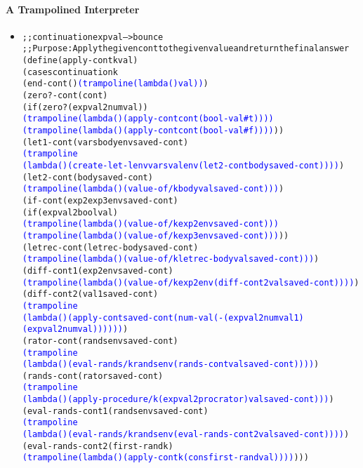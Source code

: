 \documentclass{beamer}
\begin{document}
\begin{frame}[fragile]
\framesubtitle{A Trampolined Interpreter}
\begin{tiny}
\begin{itemize}

\item<1->
\begin{alltt}
;; continuation expval --> bounce
;; Purpose: Apply the given cont to the given value and return the final answer
(define (apply-cont k val)
  (cases continuation k
    (end-cont () \textcolor{blue}{(trampoline (lambda () val))})
    (zero?-cont (cont)
     (if (zero? (expval2num val))
         \textcolor{blue}{(trampoline (lambda () (apply-cont cont (bool-val #t))))}
         \textcolor{blue}{(trampoline (lambda () (apply-cont cont (bool-val #f))))}))
    (let1-cont (vars body env saved-cont)
     \textcolor{blue}{(trampoline
      (lambda () (create-let-lenv vars val env (let2-cont body saved-cont))))})
    (let2-cont (body saved-cont)
     \textcolor{blue}{(trampoline (lambda () (value-of/k body val saved-cont)))})
    (if-cont (exp2 exp3 env saved-cont)
     (if (expval2bool val)
         \textcolor{blue}{(trampoline (lambda () (value-of/k exp2 env saved-cont)))}
         \textcolor{blue}{(trampoline (lambda () (value-of/k exp3 env saved-cont)))}))
    (letrec-cont (letrec-body saved-cont)
     \textcolor{blue}{(trampoline (lambda () (value-of/k letrec-body val saved-cont)))})
    (diff-cont1 (exp2 env saved-cont)
     \textcolor{blue}{(trampoline (lambda () (value-of/k exp2 env (diff-cont2 val saved-cont))))})
    (diff-cont2 (val1 saved-cont)
     \textcolor{blue}{(trampoline
      (lambda () (apply-cont saved-cont (num-val (- (expval2num val1) (expval2num val))))))})
    (rator-cont (rands env saved-cont)
     \textcolor{blue}{(trampoline 
      (lambda () (eval-rands/k rands env (rands-cont val saved-cont))))})
    (rands-cont (rator saved-cont)
     \textcolor{blue}{(trampoline
      (lambda () (apply-procedure/k (expval2proc rator) val saved-cont)))})
    (eval-rands-cont1 (rands env saved-cont)
     \textcolor{blue}{(trampoline 
      (lambda () (eval-rands/k rands env (eval-rands-cont2 val saved-cont))))})
    (eval-rands-cont2 (first-rand k)
     \textcolor{blue}{(trampoline (lambda () (apply-cont k (cons first-rand val))))})))
\end{alltt}

\end{itemize}
\end{tiny}
\end{frame}
\end{document}
